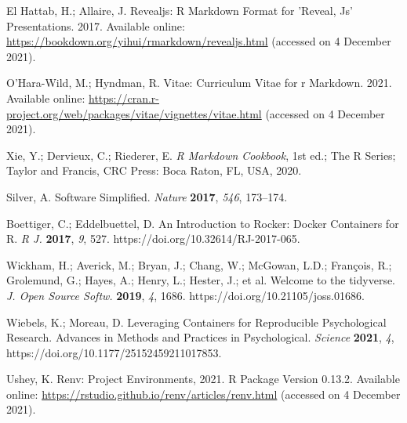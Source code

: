\documentclass[psych,tutorial,accept,moreauthors,pdftex]{Definitions/mdpi}
\begin{document}
\begin{thebibliography}{999}
El Hattab, H.; Allaire, J. Revealjs: R Markdown Format for ’Reveal, Js’ Presentations. {2017.} Available online: \url{https://bookdown.org/yihui/rmarkdown/revealjs.html} (accessed on 4 December 2021).


O’Hara-Wild, M.; Hyndman, R. Vitae: Curriculum Vitae for r Markdown. {2021.} Available online: \url{https://cran.r-project.org/web/packages/vitae/vignettes/vitae.html} (accessed on 4 December 2021).%


Xie, Y.; Dervieux, C.; Riederer, E. \emph{R Markdown Cookbook}, 1st ed.; The R Series; Taylor and Francis, CRC Press: Boca Raton, FL, USA, 2020.


Silver, A. Software Simplified. \emph{Nature} \textbf{2017}, \emph{546}, 173--174.

Boettiger, C.; Eddelbuettel, D. An Introduction to Rocker: Docker Containers for R. \emph{R J.} \textbf{2017}, \emph{9}, 527. https://doi.org/10.32614/RJ-2017-065.

Wickham, H.; Averick, M.; Bryan, J.; Chang, W.; McGowan, L.D.; François, R.; Grolemund, G.; Hayes, A.; Henry, L.; Hester, J.; et al. Welcome to the tidyverse. \emph{J. Open Source Softw.} \textbf{2019}, \emph{4}, 1686. https://doi.org/10.21105/joss.01686.

Wiebels, K.; Moreau, D. Leveraging Containers for Reproducible Psychological Research. Advances in Methods and Practices in Psychological. \emph{Science} \textbf{2021}, \emph{4}, https://doi.org/10.1177/25152459211017853.


Ushey, K. Renv: Project Environments, 2021. {R Package Version 0.13.2.} Available online: \url{https://rstudio.github.io/renv/articles/renv.html} (accessed on 4 December 2021).%



\end{thebibliography}
\end{document}
